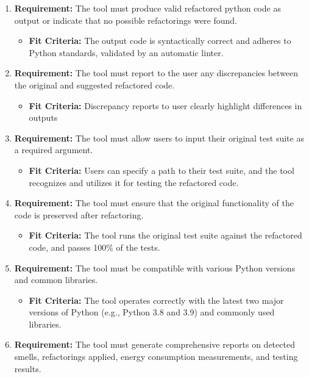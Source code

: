 \documentclass[12pt]{article}
\begin{document}
\begin{enumerate}
\begin{itemize}[label={}]
  \end{itemize}
  \item \textbf{Requirement:} The tool must produce valid refactored python code as output or indicate that no possible refactorings were found.
  \begin{itemize}[label={}]
      \item \textbf{Fit Criteria:} The output code is syntactically correct and adheres to Python standards, validated by an automatic linter.
  \end{itemize}
  \item \textbf{Requirement:} The tool must report to the user any discrepancies between the original and suggested refactored code.
  \begin{itemize}[label={}]
      \item \textbf{Fit Criteria:} Discrepancy reports to user clearly highlight differences in outputs
  \end{itemize}
  \item \textbf{Requirement:} The tool must allow users to input their original test suite as a required argument.
  \begin{itemize}[label={}]
      \item \textbf{Fit Criteria:} Users can specify a path to their test suite, and the tool recognizes and utilizes it for testing the refactored code.
  \end{itemize}
  \item \textbf{Requirement:} The tool must ensure that the original functionality of the code is preserved after refactoring.
  \begin{itemize}[label={}]
      \item \textbf{Fit Criteria:} The tool runs the original test suite against the refactored code, and passes 100\% of the tests.
  \end{itemize}
  \item \textbf{Requirement:} The tool must be compatible with various Python versions and common libraries.
  \begin{itemize}[label={}]
      \item \textbf{Fit Criteria:} The tool operates correctly with the latest two major versions of Python (e.g., Python 3.8 and 3.9) and commonly used libraries.
  \end{itemize}
  \item \textbf{Requirement:} The tool must generate comprehensive reports on detected smells, refactorings applied, energy consumption measurements, and testing results.

\end{enumerate}
\end{document}
